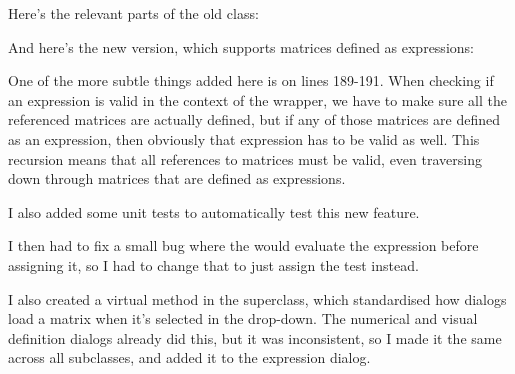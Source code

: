 \documentclass[../development.tex]{subfiles}
\begin{document}
Here's the relevant parts of the old  class:


And here's the new version, which supports matrices defined as expressions:


One of the more subtle things added here is on lines 189-191. When checking if an expression is valid in the context of the wrapper, we have to make sure all the referenced matrices are actually defined, but if any of those matrices are defined as an expression, then obviously that expression has to be valid as well. This recursion means that all references to matrices must be valid, even traversing down through matrices that are defined as expressions. %

I also added some unit tests to automatically test this new feature.



I then had to fix a small bug where the  would evaluate the expression before assigning it, so I had to change that to just assign the test instead.


I also created a virtual method in the  superclass, which standardised how dialogs load a matrix when it's selected in the drop-down. The numerical and visual definition dialogs already did this, but it was inconsistent, so I made it the same across all subclasses, and added it to the expression dialog.

\end{document}

